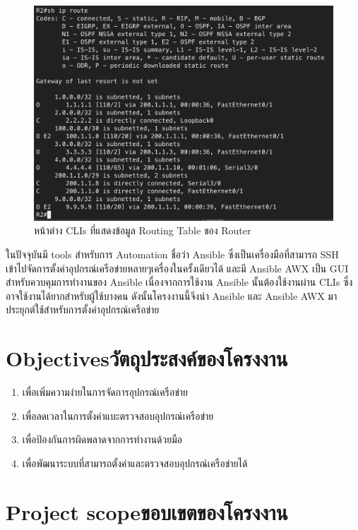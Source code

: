   \begin{figure}[h]
    \begin{center}
      \includegraphics[scale=0.4]{shRoute.png}
    \end{center}
    \caption[หน้าต่าง CLIs ที่แสดงข้อมูล Routing Table ของ Router]{หน้าต่าง CLIs ที่แสดงข้อมูล Routing Table ของ Router}
    \label{fig:shRoute}
  \end{figure}
  \hspace{0.5in}
ในปัจจุบันมี tools สำหรับการ Automation ชื่อว่า Ansible ซึ่งเป็นเครื่องมือที่สามารถ SSH เข้าไปจัดการตั้งค่าอุปกรณ์เครือข่ายหลายๆเครื่องในครั้งเดียวได้ \cite{item1} และมี Ansible AWX เป็น GUI สำหรับควบคุมการทำงานของ Ansible เนื่องจากการใช้งาน Ansible นั้นต้องใช้งานผ่าน CLIs ซึ่งอาจใช้งานได้ยากสำหรับผู้ใช้บางคน \cite{item2}
ดังนั้นโครงงานนี้จึงนำ Ansible และ Ansible AWX มาประยุกต์ใช้สำหรับการตั้งค่าอุปกรณ์เครือข่าย
\section{\ifenglish Objectives\else วัตถุประสงค์ของโครงงาน\fi}
\begin{enumerate}
    \item {เพื่อเพิ่มความง่ายในการจัดการอุปกรณ์เครือข่าย}
    \item {เพื่อลดเวลาในการตั้งค่าแบะตรวจสอบอุปกรณ์เครือข่าย}
    \item {เพื่อป้องกันการผิดพลาดจากการทำงานด้วยมือ}
    \item {เพื่อพัฒนาระบบที่สามารถตั้งค่าและตรวจสอบอุปกรณ์เครือข่ายได้}
\end{enumerate}

\section{\ifenglish Project scope\else ขอบเขตของโครงงาน\fi}
